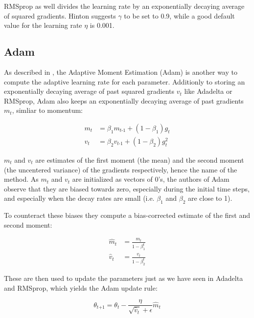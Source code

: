 \documentclass[12pt,oneside,a4paper,parskip]{scrbook}
\begin{document}
RMSprop as well divides the learning rate by an exponentially decaying average of squared gradients.
Hinton suggests $\gamma$ to be set to 0.9, while a good default value for the learning rate $\eta$ is 0.001. \cite{overvieDiffRSLVQ}

\subsection{Adam}
As described in \cite{Kingma2014AdamAM}, the Adaptive Moment Estimation (Adam) is another way to compute the adaptive 
learning rate for each parameter. Additionly to storing an exponentially decaying average of past squared gradients
$\textit{v}_t$ like Adadelta or RMSprop, Adam also keeps an exponentially decaying average of past gradients $\textit{m}_t$,
simliar to momentum:

\begin{equation}
  \begin{split}
  \textit{m}_t &= \beta_1\textit{m}_\textit{t-1} + (1-\beta_1)\textit{g}_t \\
  \textit{v}_t &= \beta_2\textit{v}_\textit{t-1} + (1-\beta_2)\textit{g}^2_t
  \end{split}
\end{equation}

$\textit{m}_t$ and $\textit{v}_t$ are estimates of the first moment (the mean) and the second moment (the uncentered variance)
of the gradients respectively, hence the name of the method. As $\textit{m}_t$ and $\textit{v}_t$ are initialized as vectors of 
0's, the authors of Adam observe that they are biased towards zero, especially during the initial time steps, and especially 
when the decay rates are small (i.e. $\beta_1$ and $\beta_2$ are close to 1).

To counteract these biases they compute a bias-corrected estimate of the first and second moment:

\begin{equation}
  \begin{split}
  \hat{m}_t &= \frac{\textit{m}_t}{1-\beta^t_1} \\
  \hat{v}_t &= \frac{\textit{v}_t}{1-\beta^t_2}
  \end{split}
\end{equation}

These are then used to update the parameters just as we have seen in Adadelta and RMSprop, which yields the Adam update rule:

\begin{equation}
\theta_\textit{t+1} = \theta_\textit{t}-\frac{\eta}{\sqrt{\hat{v}_t}+ \epsilon} \hat{m}_t
\end{equation}
\end{document}
